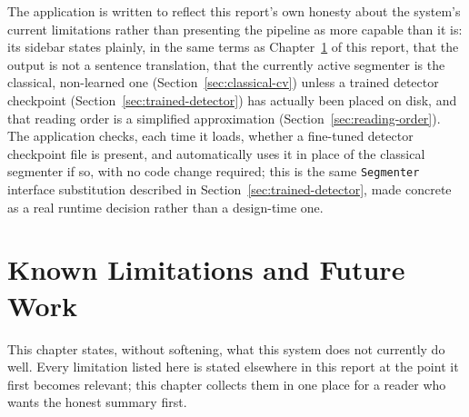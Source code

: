 \documentclass[11pt,a4paper]{report}
\begin{document}
The application is written to reflect this report's own honesty about the
system's current limitations rather than presenting the pipeline as more
capable than it is: its sidebar states plainly, in the same terms as
Chapter~\ref{ch:limitations} of this report, that the output is not a
sentence translation, that the currently active segmenter is the classical,
non-learned one (Section~\ref{sec:classical-cv}) unless a trained detector
checkpoint (Section~\ref{sec:trained-detector}) has actually been placed on
disk, and that reading order is a simplified approximation
(Section~\ref{sec:reading-order}). The application checks, each time it
loads, whether a fine-tuned detector checkpoint file is present, and
automatically uses it in place of the classical segmenter if so, with no
code change required; this is the same \texttt{Segmenter} interface
substitution described in Section~\ref{sec:trained-detector}, made
concrete as a real runtime decision rather than a design-time one.

\chapter{Known Limitations and Future Work}
\label{ch:limitations}

This chapter states, without softening, what this system does not currently
do well. Every limitation listed here is stated elsewhere in this report at
the point it first becomes relevant; this chapter collects them in one
place for a reader who wants the honest summary first.
\end{document}
